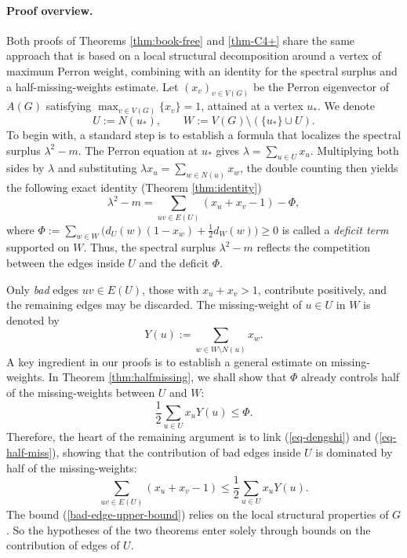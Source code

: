 \documentclass[11pt,a4paper]{article}
\theoremstyle{definition}
\theoremstyle{plain}
\renewcommand{\le}{\leqslant}
\renewcommand{\ge}{\geqslant}
\begin{document}
\paragraph{Proof overview.}
Both proofs of Theorems \ref{thm:book-free} and \ref{thm-C4+} share the same approach that is based on a local structural decomposition around a vertex of
maximum Perron weight, combining with an identity for the spectral surplus and a half-missing-weights estimate.   
Let $(x_v)_{v\in V(G)}$ be the Perron
eigenvector of $A(G)$ satisfying $\max_{v\in V(G)} \{x_v\}=1$, attained at a vertex
$u_*$. We denote 
\[ U:=N(u_*), \qquad W:=V(G)\setminus(\{u_*\}\cup U). \] 
To begin with, 
a standard step is to establish a formula that localizes the {spectral surplus}
$\lambda^2-m$. 
The Perron equation at $u_*$
gives $\lambda =\sum_{u\in U}x_u$. Multiplying both sides by $\lambda$ and substituting $\lambda x_u =\sum_{w\in N(u)} x_w$, the double counting then yields the following exact identity (Theorem \ref{thm:identity}) 
\begin{equation} \label{eq-dengshi}
\lambda^2-m=\sum_{uv\in E(U)}(x_u+x_v-1)-\Phi, 
\end{equation}
where $\Phi := \sum_{w\in W} \big(d_U(w)(1-x_w) + \frac{1}{2}d_W(w) \big) \ge 0$ is called a \emph{deficit term} supported on $W$. 
Thus, the spectral surplus $\lambda^2-m$ reflects the competition between the edges
inside $U$ and the deficit $\Phi$. 

Only \emph{bad} edges $uv\in E(U)$, those with $x_u+x_v >1$, 
contribute positively, and the remaining edges may be discarded. 
The missing-weight of $u\in U$ in $W$ is denoted by 
$$ Y(u):=\sum_{w\in W\setminus N(u)}x_w .$$ 
A key ingredient in our proofs is to establish a general estimate on missing-weights. In Theorem \ref{thm:halfmissing}, we shall show that $\Phi$ already controls
half of the missing-weights between $U$ and $W$:  
\begin{equation} \label{eq-half-miss}
     \frac12\sum_{u\in U}x_uY(u) \le \Phi. 
\end{equation} 
Therefore, the heart of the remaining argument is to link (\ref{eq-dengshi}) and (\ref{eq-half-miss}),  showing that the contribution of bad edges inside $U$ is dominated by half of the missing-weights:  
\begin{equation} \label{bad-edge-upper-bound}
  \sum_{uv\in E(U)}(x_u+x_v-1)\le \frac12\sum_{u\in U}x_uY(u). 
\end{equation}
The bound (\ref{bad-edge-upper-bound}) relies on the local structural properties of $G$. So the hypotheses of the two theorems enter solely through
bounds on the contribution of edges of $U$. 
\end{document}

